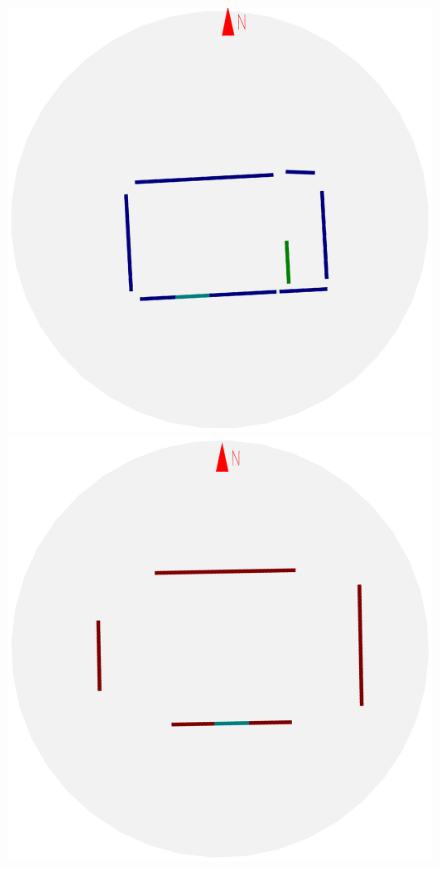 \begin{figure}[t]
\begin{center}
\begin{minipage}[b]{0.72\textwidth}
  \includegraphics[width=\figwidth]{f2_5_2D_walls_rotate} %
  \includegraphics[width=\figwidth]{f2_9_2D_walls_rotate} %

\end{minipage}
\end{center}
\end{figure}
